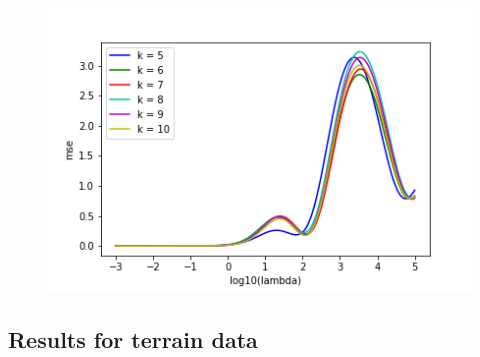 \begin{figure}[h]
	\centering
	\includegraphics[width=\textwidth]{Images/Crossval_plot.png}
	\caption{}
	\label{Cross validation itterated over k figure}
\end{figure}

\subsection{Results for terrain data}
